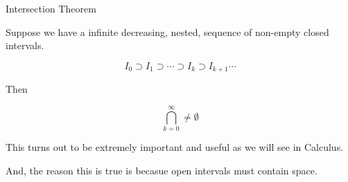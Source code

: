 \documentclass{ximera}
\begin{document}
\begin{theorem} Intersection Theorem


Suppose we have a infinite decreasing, nested, sequence of non-empty closed intervals.


\[   I_0 \supset    I_1 \supset  \cdots \supset I_{k}   \supset I_{k+1}  \cdots  \]



Then 


\[   \bigcap_{k=0}^{\infty} \ne \emptyset         \]


\end{theorem}













This turns out to be extremely important and useful as we will see in Calculus.


And, the reason this is true is becasue open intervals must contain space.
\end{document}
